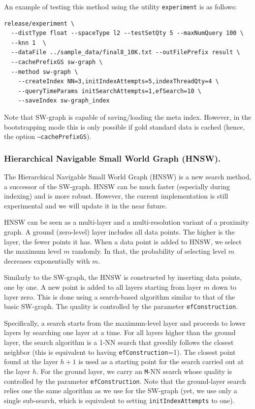 \documentclass[runningheads,a4paper]{llncs}
\newcommand{\ttt}[1]{\texttt{#1}}
\begin{document}
An example of testing this method using the utility \texttt{experiment} is as follows:
{
\footnotesize
\begin{verbatim}
release/experiment \
  --distType float --spaceType l2 --testSetQty 5 --maxNumQuery 100 \
  --knn 1  \
  --dataFile ../sample_data/final8_10K.txt --outFilePrefix result \
  --cachePrefixGS sw-graph \
  --method sw-graph \
    --createIndex NN=3,initIndexAttempts=5,indexThreadQty=4 \
    --queryTimeParams initSearchAttempts=1,efSearch=10 \
    --saveIndex sw-graph_index
\end{verbatim}
}
Note that SW-graph is capable of saving/loading the meta index. However, in the bootstrapping
mode this is only possible if gold standard data is cached (hence, the option \ttt{--cachePrefixGS}).

\subsubsection{Hierarchical Navigable Small World Graph (HNSW).} \label{SectionHNSW}

The Hierarchical Navigable Small World Graph (HNSW) \cite{Malkov2016} is a new search method,
a successor of the SW-graph.
HNSW can be much faster (especially during indexing) and is more robust.
However, the current implementation is still experimental and we will update it in the near future.

HNSW can be seen as a multi-layer and a multi-resolution variant of a proximity graph.
A ground (zero-level) layer includes all data points. The higher is the layer, the fewer points it has.
When a data point is added to HNSW, we select the maximum level $m$ randomly. 
In that, the probability of selecting level $m$ decreases exponentially with $m$.

Similarly to the SW-graph, the HNSW is constructed by inserting data points, one by one.
A new point is added to all layers starting from layer $m$ down to layer zero.
This is done using a search-based algorithm similar to that of the basic SW-graph. 
The quality is controlled by the parameter \ttt{efConstruction}.

Specifically, a search starts from the maximum-level layer and proceeds to lower layers by searching one layer at a time.
For all layers higher than the ground layer, the search algorithm is a 1-NN search 
that greedily follows the closest neighbor (this is equivalent to having \ttt{efConstruction}=1).
The closest point found at the layer $h+1$ is used as a starting point for the search carried out at the layer $h$. 
For the ground layer, we carry an \ttt{M}-NN search whose quality is controlled by the parameter \ttt{efConstruction}.
Note that the ground-layer search relies one the same algorithm as we use for the SW-graph (yet,
we use only a single sub-search, which is equivalent to setting \ttt{initIndexAttempts} to one).
\end{document}
